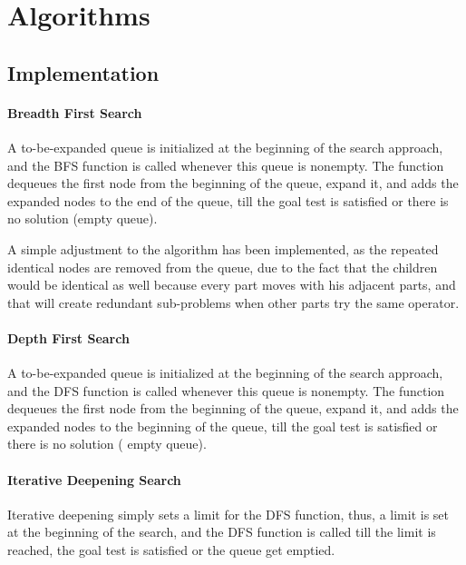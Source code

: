 \chapter{Algorithms}
\section{Implementation}
\subsubsection{Breadth First Search}

A to-be-expanded queue is initialized at the beginning of the search approach, and the BFS function is called whenever this queue is nonempty. The function dequeues the first node from the beginning of the queue, expand it, and adds the expanded nodes to the end of the queue, till the goal test is satisfied or there is no solution (empty queue).

A simple adjustment to the algorithm has been implemented, as the repeated identical nodes are removed from the queue, due to the fact that the children would be identical as well because every part moves with his adjacent parts, and that will create redundant sub-problems when other parts try the same operator. 

\subsubsection{Depth First Search}

A to-be-expanded queue is initialized at the beginning of the search approach, and the DFS function is called whenever this queue is nonempty. The function dequeues the first node from the beginning of the queue, expand it, and adds the expanded nodes to the beginning of the queue, till the goal test is satisfied or there is no solution ( empty queue). 


\subsubsection{Iterative Deepening Search}

Iterative deepening simply sets a limit for the DFS function, thus, a limit is set at the beginning of the search, and the DFS function is called till the limit is reached, the goal test is satisfied or the queue get emptied.

